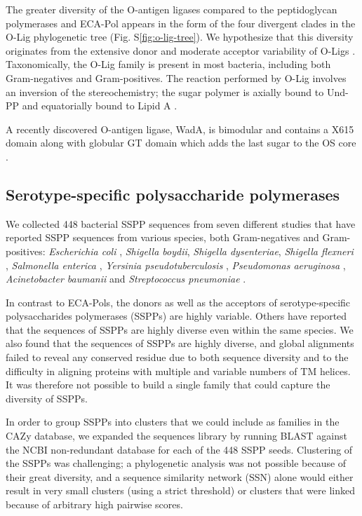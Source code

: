 \documentclass{article}
\begin{document}
The greater diversity of the O-antigen ligases compared to the peptidoglycan polymerases and ECA-Pol appears in the form of the four divergent clades in the O-Lig phylogenetic tree (Fig. S\ref{fig:o-lig-tree}). We hypothesize that this diversity originates from the extensive donor and moderate acceptor variability of O-Ligs \cite{di_lorenzo_journey_2022}. Taxonomically, the O-Lig family is present in most bacteria, including both Gram-negatives and Gram-positives. The reaction performed by O-Lig involves an inversion of the stereochemistry; the sugar polymer is axially bound to Und-PP and equatorially bound to Lipid A \cite{ruan_waal_2012}. 

A recently discovered O-antigen ligase, WadA, is bimodular and contains a X615 domain along with globular GT domain which adds the last sugar to the OS core \cite{servais_lipopolysaccharide_2023}.

\subsection{Serotype-specific polysaccharide polymerases}

We collected 448 bacterial SSPP sequences from seven different studies that have reported SSPP sequences from various species, both Gram-negatives and Gram-positives: \textit{Escherichia coli} \cite{iguchi_complete_2015,joensen_rapid_2015}, \textit{Shigella boydii}, \textit{Shigella dysenteriae}, \textit{Shigella flexneri} \cite{liu_structure_2008}, \textit{Salmonella enterica} \cite{liu_structural_2014}, \textit{Yersinia pseudotuberculosis} \cite{kenyon_genetics_2017}, \textit{Pseudomonas aeruginosa} \cite{islam_synthesis_2014}, \textit{Acinetobacter baumanii} \cite{hu_diversity_2013} and 
\textit{Streptococcus pneumoniae} \cite{bentley_genetic_2006}. 

In contrast to ECA-Pols, the donors as well as the acceptors of serotype-specific polysaccharides polymerases (SSPPs) are highly variable. Others have reported that the sequences of SSPPs are highly diverse even within the same species\cite{islam_synthesis_2014}. We also found that the sequences of SSPPs are highly diverse, and global alignments failed to reveal any conserved residue due to both sequence diversity and to the difficulty in aligning proteins with multiple and variable numbers of TM helices. It was therefore not possible to build a single family that could capture the diversity of SSPPs.

In order to group SSPPs into clusters that we could include as families in the CAZy database, we expanded the sequences library by running BLAST against the NCBI non-redundant database for each of the 448 SSPP seeds. Clustering of the SSPPs was challenging; a phylogenetic analysis was not possible because of their great diversity, and a sequence similarity network (SSN) alone would either result in very small clusters (using a strict threshold) or clusters that were linked because of arbitrary high pairwise scores. 
\end{document}
